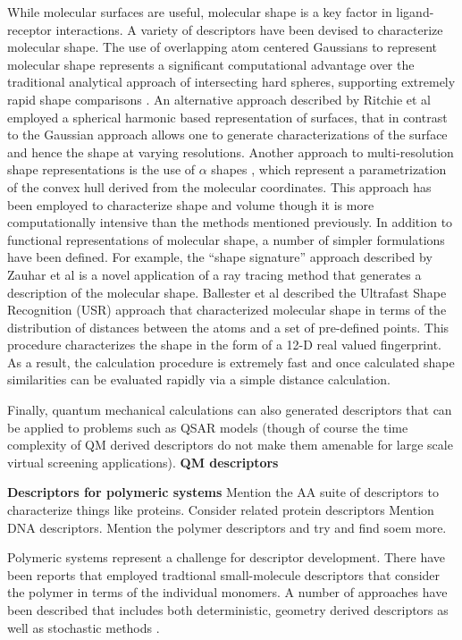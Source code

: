 \documentclass[letterpaper, 12pt]{article}
\begin{document}
While molecular surfaces are useful, molecular shape is a key factor
in ligand-receptor interactions. A variety of descriptors have been
devised to characterize molecular shape. The use of overlapping atom
centered Gaussians to represent molecular shape \cite{Grant:1995aa}
represents a significant computational advantage over the traditional
analytical approach of intersecting hard spheres, supporting extremely
rapid shape comparisons \cite{Grant:1999vn}. An alternative approach
described by Ritchie et al \cite{Ritchie:1999kx} employed a spherical
harmonic based representation of surfaces, that in contrast to the
Gaussian approach allows one to generate characterizations of the
surface and hence the shape at varying resolutions. Another approach
to multi-resolution shape representations is the use of $\alpha$
shapes \cite{Edelsbrunner:1994aa}, which represent a parametrization
of the convex hull derived from the molecular coordinates. This
approach has been employed to characterize shape and volume
\cite{Wilson:2009ys} though it is more computationally intensive than
the methods mentioned previously. In addition to functional
representations of molecular shape, a number of simpler formulations
have been defined. For example, the ``shape signature'' approach
described by Zauhar et al \cite{Zauhar:2003fk} is a novel application
of a ray tracing method that generates a description of the molecular
shape. Ballester et al \cite{Ballester:2007aa} described the Ultrafast
Shape Recognition (USR) approach that characterized molecular shape in
terms of the distribution of distances between the atoms and a set of
pre-defined points. This procedure characterizes the shape in the form
of a 12-D real valued fingerprint. As a result, the calculation
procedure is extremely fast and once calculated shape similarities can
be evaluated rapidly via a simple distance calculation.


Finally, quantum mechanical calculations can also generated
descriptors that can be applied to problems such as QSAR models
(though of course the time complexity of QM derived descriptors do not
make them amenable for large scale virtual screening applications).
\textbf{QM descriptors}

\textbf{Descriptors for polymeric systems} Mention the AA suite of
descriptors to characterize things like proteins. Consider related
protein descriptors Mention DNA
descriptors. Mention the polymer descriptors and try and find soem
more.

Polymeric systems represent a challenge for descriptor
development. There have been reports that employed tradtional
small-molecule descriptors \cite{Mattioni:2002dq,Katritzky:1998cr}
that consider the polymer in terms of the individual monomers. A
number of approaches have been described that includes both
deterministic, geometry derived descriptors \cite{Edvinsson:2003bh} as
well as stochastic methods \cite{Gonzales-Diaz:2003ly}.
\end{document}
